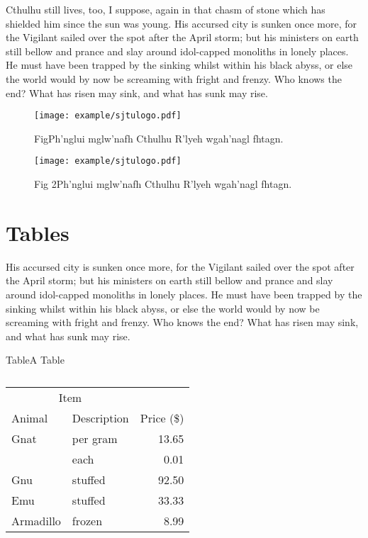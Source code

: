 Cthulhu still lives, too, I suppose, again in that chasm of stone which has shielded him since the sun was young. His accursed city is sunken once more, for the Vigilant sailed over the spot after the April storm; but his ministers on earth still bellow and prance and slay around idol-capped monoliths in lonely places. He must have been trapped by the sinking whilst within his black abyss, or else the world would by now be screaming with fright and frenzy. Who knows the end? What has risen may sink, and what has sunk may rise. 

\begin{figure}[!htp]
 \centering
 \texttt{[image: example/sjtulogo.pdf]}
 \caption[fig:longcaptionbad]{}{}{Fig}{Ph'nglui mglw'nafh Cthulhu R'lyeh wgah'nagl fhtagn.}
\end{figure}

\begin{figure}[!htbp]
  \centering
  \begin{minipage}[b]{0.6\textwidth}
    \centering
    \texttt{[image: example/sjtulogo.pdf]}
    \caption[fig:longcaptiongood]{}{}{Fig 2}{Ph'nglui mglw'nafh Cthulhu R'lyeh wgah'nagl fhtagn.}
  \end{minipage}     
\end{figure}

\section{Tables}
\label{sec:tab}

His accursed city is sunken once more, for the Vigilant sailed over the spot after the April storm; but his ministers on earth still bellow and prance and slay around idol-capped monoliths in lonely places. He must have been trapped by the sinking whilst within his black abyss, or else the world would by now be screaming with fright and frenzy. Who knows the end? What has risen may sink, and what has sunk may rise. 

\begin{table}[!hpb]
  \centering
  \caption[tab:firstone]{\footnotemark[1]}{Table}{A Table}
  \begin{tabular}{@{}llr@{}} \toprule
    \multicolumn{2}{c}{Item} \\ \cmidrule(r){1-2}
    Animal & Description & Price (\$)\\ \midrule
    Gnat & per gram & 13.65 \\
    & each & 0.01 \\
    Gnu & stuffed & 92.50 \\
    Emu & stuffed & 33.33 \\
    Armadillo & frozen & 8.99 \\ \bottomrule
  \end{tabular}
\end{table}

